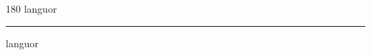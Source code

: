 
\begin{frame}
\begin{center}
\begin{turn}{180}
{\fontsize{2.5cm}{1em}\selectfont languor}
\end{turn}
\vspace{1em}\par  
\hrule
\vspace{1em}\par  
{\fontsize{2.5cm}{1em}\selectfont languor}
\end{center}
\end{frame}

